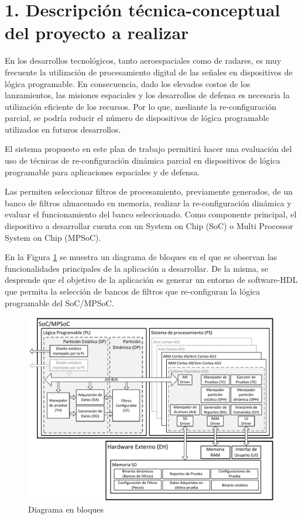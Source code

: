 \documentclass[
11pt, %
]{charter}
\begin{document}
\section{1. Descripción técnica-conceptual del proyecto a realizar}
\label{sec:descripcion}

En los desarrollos tecnológicos, tanto aeroespaciales como de radares, es muy frecuente la utilización de procesamiento digital de las señales en dispositivos de lógica programable. En consecuencia, dado los elevados costos de los lanzamientos, las misiones espaciales y los desarrollos de defensa es necesaria la utilización eficiente de los recursos. Por lo que, mediante la re-configuración parcial, se podría reducir el número de dispositivos de lógica programable utilizados en futuros desarrollos.

El sistema propuesto en este plan de trabajo permitirá hacer una evaluación del uso de técnicas de re-configuración dinámica parcial en dispositivos de lógica programable para aplicaciones espaciales y de defensa.

Las \ttitle permiten seleccionar filtros de procesamiento, previamente generados, de un banco de filtros almacenado en memoria, realizar la re-configuración dinámica y evaluar el funcionamiento del banco seleccionado. Como componente principal, el dispositivo a desarrollar cuenta con un System on Chip (SoC) o Multi Processor System on Chip (MPSoC).

En la Figura \ref{fig:diagBloques} se muestra un diagrama de bloques en el que se observan las funcionalidades principales de la aplicación a desarrollar. De la misma, se desprende que el objetivo de la aplicación es generar un entorno de software-HDL que permita la selección de bancos de filtros que re-configuran la lógica programable del SoC/MPSoC.

\begin{figure}[h]
\raggedleft
\includegraphics[width=1.05\textwidth]{./Figuras/DiagamaCPR_grande.pdf}
\caption{Diagrama en bloques}
\label{fig:diagBloques}
\end{figure}
\end{document}
